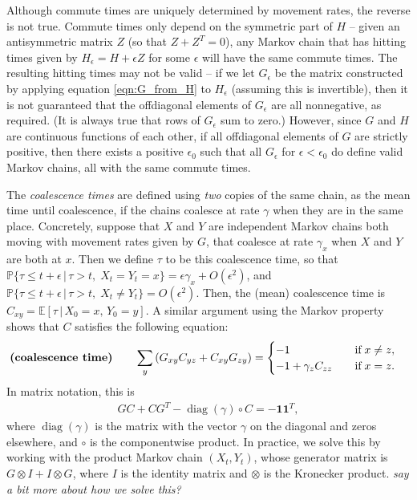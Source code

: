 \documentclass{article}
\DeclareMathOperator{\diag}{\mathop{\mbox{diag}}}
\renewcommand{\P}{\mathbb{P}}
\newcommand{\E}{\mathbb{E}}
\newcommand{\given}{\,\vert\,}
\newcommand{\bone}{\mathbf{1}}
\newcommand{\plr}[1]{{\em \color{blue} #1}}
\begin{document}
Although commute times are uniquely determined by movement rates, the reverse is not true.
Commute times only depend on the symmetric part of $H$ --
given an antisymmetric matrix $Z$ (so that $Z + Z^T = 0$),
any Markov chain that has hitting times given by $H_\epsilon = H + \epsilon Z$ for some $\epsilon$
will have the same commute times.
The resulting hitting times may not be valid --
if we let $G_\epsilon$ be the matrix constructed by applying equation \eqref{eqn:G_from_H} to $H_\epsilon$
(assuming this is invertible),
then it is not guaranteed that the offdiagonal elements of $G_\epsilon$ are all nonnegative, as required.
(It is always true that rows of $G_\epsilon$ sum to zero.)
However, since $G$ and $H$ are continuous functions of each other,
if all offdiagonal elements of $G$ are strictly positive,
then there exists a positive $\epsilon_0$ such that all $G_\epsilon$ for $\epsilon < \epsilon_0$
do define valid Markov chains, all with the same commute times.

The \emph{coalescence times} are defined using \emph{two} copies of the same chain,
as the mean time until coalescence,
if the chains coalesce at rate $\gamma$ when they are in the same place.
Concretely, 
suppose that $X$ and $Y$ are independent Markov chains both moving with movement rates given by $G$,
that coalesce at rate $\gamma_x$ when $X$ and $Y$ are both at $x$.
Then we define $\tau$ to be this coalescence time,
so that 
$\P\{\tau \le t + \epsilon \given \tau > t, \; X_t = Y_t = x\} = \epsilon \gamma_x + O(\epsilon^2)$,
and 
$\P\{\tau \le t + \epsilon \given \tau > t, \; X_t \neq Y_t\} = O(\epsilon^2)$.
Then, the (mean) coalescence time is $C_{xy} = \E[\tau \given X_0 = x, \, Y_0 = y]$.
A similar argument using the Markov property
shows that $C$ satisfies the following equation:
\begin{align}
\text{\bf (coalescence time)} \qquad
    \sum_y \left(G_{xy} C_{yz} + C_{xy} G_{zy}\right)
    &=
    \begin{cases}
        -1                   \quad & \text{if} \; x \neq z, \\
        -1 + \gamma_z C_{zz} \quad & \text{if} \; x = z.
    \end{cases}
\end{align}
In matrix notation, this is
\begin{align} \label{eqn:C_matrix}
    G C + C G^T - \diag(\gamma) \circ C = -\bone \bone^T,
\end{align}
where $\diag(\gamma)$ is the matrix with the vector $\gamma$ on the diagonal and zeros elsewhere,
and $\circ$ is the componentwise product.
In practice, we solve this by working with the product Markov chain $(X_t, Y_t)$,
whose generator matrix is $G \otimes I + I \otimes G$,
where $I$ is the identity matrix and $\otimes$ is the Kronecker product.
\plr{say a bit more about how we solve this?}
\end{document}
